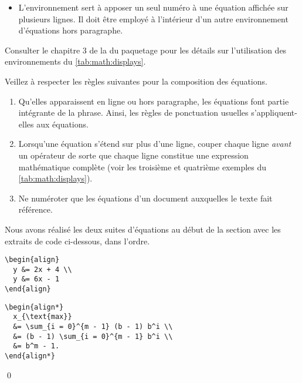 \begin{itemize}
\begin{demo}
    \begin{texample}
\begin{lstlisting}
L'équation \eqref{eq:5} du
tableau `\ref*{tab:math:displays}' démontre que...
\end{lstlisting}
      \producing
      L'équation \eqref{eq:math:5} du tableau
      \ref*{tab:math:displays} démontre que\dots
    \end{texample}
  \end{demo}
\item L'environnement  sert à apposer un seul numéro à une
  équation affichée sur plusieurs lignes. Il doit être employé à
  l'intérieur d'un autre environnement d'équations hors paragraphe.
\end{itemize}
Consulter le chapitre 3 de la %
du paquetage  pour les détails sur
l'utilisation des environnements du \autoref*{tab:math:displays}.

\begin{conseil}
  Veillez à respecter les règles suivantes pour la composition des
  équations.
  \begin{enumerate}
  \item Qu'elles apparaissent en ligne ou hors paragraphe, les
    équations font partie intégrante de la phrase. Ainsi, les règles
    de ponctuation usuelles s'appliquent-elles aux équations.
  \item Lorsqu'une équation s'étend sur plus d'une ligne, couper
    chaque ligne \emph{avant} un opérateur de sorte que chaque ligne
    constitue une expression mathématique complète (voir les troisième
    et quatrième exemples du \autoref{tab:math:displays}).
  \item Ne numéroter que les équations d'un document auxquelles le
    texte fait référence.
  \end{enumerate}
\end{conseil}

\begin{exemple}
  Nous avons réalisé les deux suites d'équations au début de la
  section avec les extraits de code ci-dessous, dans l'ordre.
\begin{lstlisting}
\begin{align}
  y &= 2x + 4 \\
  y &= 6x - 1
\end{align}
\end{lstlisting}
\begin{lstlisting}
\begin{align*}
  x_{\text{max}}
  &= \sum_{i = 0}^{m - 1} (b - 1) b^i \\
  &= (b - 1) \sum_{i = 0}^{m - 1} b^i \\
  &= b^m - 1.
\end{align*}
\end{lstlisting}
  \qed
\end{exemple}


